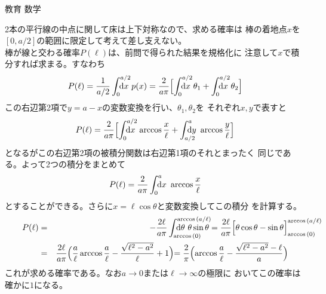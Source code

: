 \documentclass[fleqn]{jbook}
\begin{document}
\begin{answer}{教育 数学}{}
\begin{subanswers}
\begin{subsubanswers}
  \SubSubAnswer
    2本の平行線の中点に関して床は上下対称なので、求める確率は
    棒の着地点$x$を$[0,a/2]$の範囲に限定して考えて差し支えない。\\
%
    棒が線と交わる確率$P(\ell)$は、前問で得られた結果を規格化に
    注意して$x$で積分すれば求まる。すなわち
%
    \[ P(\ell) = \frac{1}{a/2} \Dint{0}{a/2}{\d{x}} p(x)%
               = \frac{2}{a\pi} \Bigl[%
                     \Dint{0}{a/2}{\d{x}} \theta_1%
                   + \Dint{0}{a/2}{\d{x}} \theta_2%
                  \Bigr] \]
%
    この右辺第2項で$y=a-x$の変数変換を行い、$\theta_1,\theta_2$を
    それぞれ$x,y$で表すと
%
    \[ P(\ell) = \frac{2}{a\pi} \Bigl[%
                     \Dint{0}{a/2}{\d{x}} \arccos\frac{x}{\ell}%
                   + \Dint{a/2}{a}{\d{y}} \arccos\frac{y}{\ell}
                     \Bigr]
\]
%
    となるがこの右辺第2項の被積分関数は右辺第1項のそれとまったく
    同じである。よって2つの積分をまとめて
%
    \[ P(\ell) = \frac{2}{a\pi} \Dint{0}{a}{\d{x}} \arccos\frac{x}{\ell} \]
%
    とすることができる。さらに$x=\ell\cos\theta$と変数変換してこの積分
    を計算する。
%
    \begin{eqnarray*}
      P(\ell) &=& -\frac{2\ell}{a\pi} \Dint{\arccos{(0)}}{\arccos{(a/\ell)}}{\d{\theta}} \theta\sin\theta%
               = \frac{2\ell}{a\pi} \Bigl[ \theta\cos\theta-\sin\theta \Bigr]_{\nsub{\arccos{(0)}}}^{\nsub{\arccos{(a/\ell)}}} \\
              &=& \frac{2\ell}{a\pi} \Bigl( \frac{a}{\ell} \arccos{\frac{a}{\ell}} - \frac{\sqrt{\ell^2-a^2}}{\ell} + 1 \Bigl) %
               =  \frac{2}{\pi} \Bigl( \arccos{\frac{a}{\ell}} - \frac{\sqrt{\ell^2-a^2} - \ell}{a} \Bigl)
    \end{eqnarray*}
%
    これが求める確率である。なお$a\to0$または$\ell\to\infty$の極限に
    おいてこの確率は確かに$1$になる。

  \end{subsubanswers}

\end{subanswers}
\end{answer}
\end{document}
